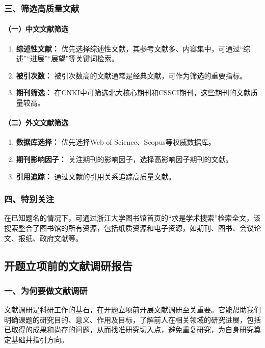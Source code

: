 \subsubsection*{三、筛选高质量文献}

\paragraph{（一）中文文献筛选}

\begin{enumerate}
  \item \textbf{综述性文献：} 优先选择综述性文献，其参考文献多、内容集中，可通过“综述”“进展”“展望”等关键词检索。
  \item \textbf{被引次数：} 被引次数高的文献通常是经典文献，可作为筛选的重要指标。
  \item \textbf{期刊筛选：} 在CNKI中可筛选北大核心期刊和CSSCI期刊，这些期刊的文献质量较高。
\end{enumerate}

\paragraph{（二）外文文献筛选}

\begin{enumerate}
  \item \textbf{数据库选择：} 优先选择Web of Science、Scopus等权威数据库。
  \item \textbf{期刊影响因子：} 关注期刊的影响因子，选择高影响因子期刊的文献。
  \item \textbf{引用追踪：} 通过文献的引用关系追踪高质量文献。
\end{enumerate}

\subsubsection*{四、特别关注}

在已知题名的情况下，可通过浙江大学图书馆首页的“求是学术搜索”检索全文，该搜索整合了图书馆的所有资源，包括纸质资源和电子资源，如期刊、图书、会议论文、报纸、政府文献等。

\subsection{开题立项前的文献调研报告}
\subsubsection*{一、为何要做文献调研}
文献调研是科研工作的基石，在开题立项前开展文献调研至关重要。它能帮助我们明确课题的研究目的、意义、作用及目标，了解前人在相关领域的研究进展，包括已取得的成果和尚存的问题，从而找准研究切入点，避免重复研究，为自身研究奠定基础并指引方向。
